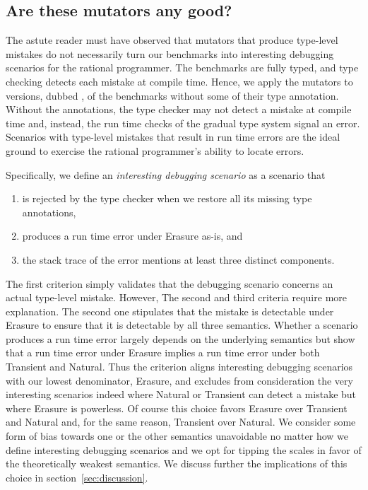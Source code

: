 \subsection{Are these mutators any good?}

The astute reader must have observed that mutators that produce 
type-level mistakes do not necessarily turn our benchmarks into
interesting debugging scenarios for the rational programmer.  The
benchmarks are fully typed, and type checking detects each mistake at
compile time.  Hence, we apply the mutators to versions, dubbed
, of the benchmarks without 
some  of their type annotation.  Without the annotations, the type
checker may not detect a mistake at compile time and, instead, the run
time checks
of the gradual type system signal an error.  Scenarios
with type-level mistakes that result in run time errors are the ideal
ground to exercise the rational programmer's ability to locate errors.

Specifically, we define an \emph{interesting debugging scenario} as a
scenario that
\begin{enumerate} 
  \item is rejected by the type checker when we restore all its missing type annotations, 
  \item produces a run time error under Erasure as-is, and 
  \item the stack trace of the error mentions at least three distinct components.  
\end{enumerate}

The first criterion simply validates that the debugging scenario concerns
an actual type-level mistake. However, The second and third criteria require 
more explanation.  The second one stipulates that the mistake is
detectable under Erasure to ensure that it is detectable by all three
semantics.   Whether a scenario produces a run time error largely depends on 
the underlying semantics but \citet{gfd-oopsla-2019}
show that a run time error under Erasure implies a run time
error under both Transient and Natural. Thus the criterion aligns
interesting debugging scenarios with our lowest denominator, Erasure, 
and excludes  from consideration the very interesting scenarios indeed where Natural or
Transient can detect a mistake but where Erasure is powerless. Of course this choice favors
Erasure over Transient and Natural and, for the same reason, Transient over
Natural. We consider some form of bias towards one or the other semantics
unavoidable no matter how we define interesting debugging scenarios and we
opt for tipping the scales in favor of the theoretically weakest
semantics. We discuss further the implications of this choice in
section~\ref{sec:discussion}.

